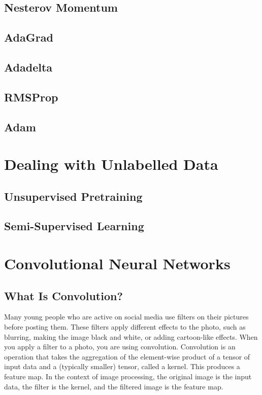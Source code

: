 \documentclass{article}
\begin{document}
\subsection{Nesterov Momentum}


\subsection{AdaGrad} %

\subsection{Adadelta} %

\subsection{RMSProp} %

\subsection{Adam} %

\section{Dealing with Unlabelled Data}

\subsection{Unsupervised Pretraining}

\subsection{Semi-Supervised Learning} %

\section{Convolutional Neural Networks}


\subsection{What Is Convolution?}

Many young people who are active on social media use filters on their pictures before posting them. These filters apply different effects to the photo, such as blurring, making the image black and white, or adding cartoon-like effects. When you apply a filter to a photo, you are using convolution. Convolution is an operation that takes the aggregation of the element-wise product of a tensor of input data and a (typically smaller) tensor, called a kernel. This produces a feature map. In the context of image processing, the original image is the input data, the filter is the kernel, and the filtered image is the feature map. 
\end{document}

